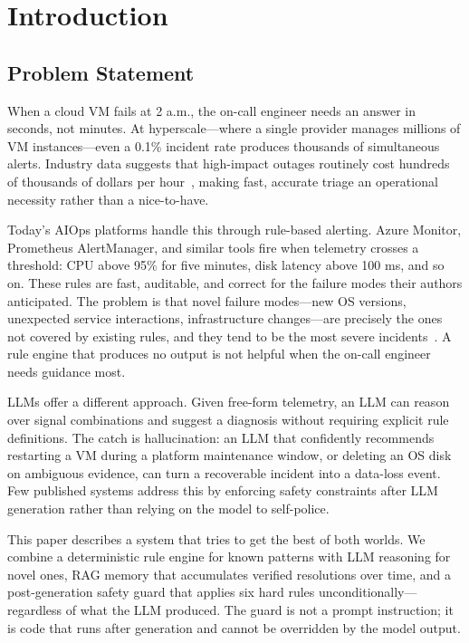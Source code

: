 \documentclass[a4paper,10pt,journal,compsoc]{IEEEtran}
\begin{document}
\section{Introduction}

\subsection{Problem Statement}

When a cloud VM fails at 2 a.m., the on-call engineer needs an answer
in seconds, not minutes. At hyperscale---where a single provider
manages millions of VM instances---even a 0.1\% incident rate produces
thousands of simultaneous alerts. Industry data suggests that
high-impact outages routinely cost hundreds of thousands of dollars per
hour~\cite{uptime2023outage}, making fast, accurate triage an
operational necessity rather than a nice-to-have.

Today's AIOps platforms handle this through rule-based alerting.
Azure Monitor, Prometheus AlertManager, and similar tools fire when
telemetry crosses a threshold: CPU above 95\% for five minutes, disk
latency above 100 ms, and so on. These rules are fast, auditable, and
correct for the failure modes their authors anticipated. The problem is
that novel failure modes---new OS versions, unexpected service
interactions, infrastructure changes---are precisely the ones not
covered by existing rules, and they tend to be the most severe
incidents~\cite{chen2024rcacopilot}. A rule engine that produces no
output is not helpful when the on-call engineer needs guidance most.

LLMs offer a different approach. Given free-form telemetry, an LLM can
reason over signal combinations and suggest a diagnosis without
requiring explicit rule definitions. The catch is hallucination: an LLM
that confidently recommends restarting a VM during a platform
maintenance window, or deleting an OS disk on ambiguous evidence, can
turn a recoverable incident into a data-loss event. Few published
systems address this by enforcing safety constraints after LLM
generation rather than relying on the model to self-police.

This paper describes a system that tries to get the best of both
worlds. We combine a deterministic rule engine for known patterns with
LLM reasoning for novel ones, RAG memory that accumulates verified
resolutions over time, and a post-generation safety guard that applies
six hard rules unconditionally---regardless of what the LLM produced.
The guard is not a prompt instruction; it is code that runs after
generation and cannot be overridden by the model output.
\end{document}
